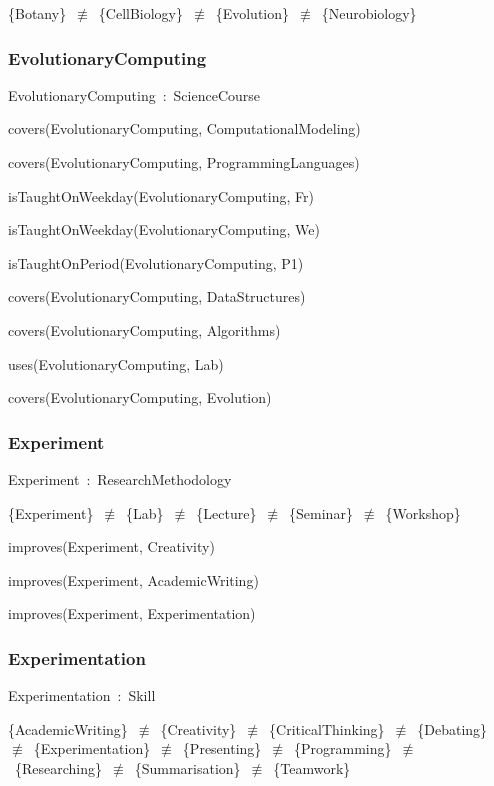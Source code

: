\documentclass{article}
\begin{document}
\{Botany\}~\ensuremath{\not\equiv}~\{CellBiology\}~\ensuremath{\not\equiv}~\{Evolution\}~\ensuremath{\not\equiv}~\{Neurobiology\}

\subsubsection*{EvolutionaryComputing}

EvolutionaryComputing~:~ScienceCourse

covers(EvolutionaryComputing, ComputationalModeling)

covers(EvolutionaryComputing, ProgrammingLanguages)

isTaughtOnWeekday(EvolutionaryComputing, Fr)

isTaughtOnWeekday(EvolutionaryComputing, We)

isTaughtOnPeriod(EvolutionaryComputing, P1)

covers(EvolutionaryComputing, DataStructures)

covers(EvolutionaryComputing, Algorithms)

uses(EvolutionaryComputing, Lab)

covers(EvolutionaryComputing, Evolution)

\subsubsection*{Experiment}

Experiment~:~ResearchMethodology

\{Experiment\}~\ensuremath{\not\equiv}~\{Lab\}~\ensuremath{\not\equiv}~\{Lecture\}~\ensuremath{\not\equiv}~\{Seminar\}~\ensuremath{\not\equiv}~\{Workshop\}

improves(Experiment, Creativity)

improves(Experiment, AcademicWriting)

improves(Experiment, Experimentation)

\subsubsection*{Experimentation}

Experimentation~:~Skill

\{AcademicWriting\}~\ensuremath{\not\equiv}~\{Creativity\}~\ensuremath{\not\equiv}~\{CriticalThinking\}~\ensuremath{\not\equiv}~\{Debating\}~\ensuremath{\not\equiv}~\{Experimentation\}~\ensuremath{\not\equiv}~\{Presenting\}~\ensuremath{\not\equiv}~\{Programming\}~\ensuremath{\not\equiv}~\{Researching\}~\ensuremath{\not\equiv}~\{Summarisation\}~\ensuremath{\not\equiv}~\{Teamwork\}
\end{document}
